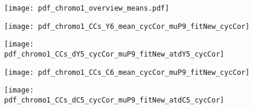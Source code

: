 
\begin{figure}
	\centering
	\texttt{[image: pdf\_chromo1\_overview\_means.pdf]}
	\clearpage %
	\label{fig:XXX:XXX}
\end{figure}	

\clearpage



\begin{figure}
	\centering
	\texttt{[image: pdf\_chromo1\_CCs\_Y6\_mean\_cycCor\_muP9\_fitNew\_cycCor]}
	\clearpage %
	\label{fig:XXX:XXX}
\end{figure}	

\clearpage



\begin{figure}
	\centering
	\texttt{[image: pdf\_chromo1\_CCs\_dY5\_cycCor\_muP9\_fitNew\_atdY5\_cycCor]}
	\clearpage %
	\label{fig:XXX:XXX}
\end{figure}	

\clearpage



\begin{figure}
	\centering
	\texttt{[image: pdf\_chromo1\_CCs\_C6\_mean\_cycCor\_muP9\_fitNew\_cycCor]}
	\clearpage %
	\label{fig:XXX:XXX}
\end{figure}	

\clearpage



\begin{figure}
	\centering
	\texttt{[image: pdf\_chromo1\_CCs\_dC5\_cycCor\_muP9\_fitNew\_atdC5\_cycCor]}
	\clearpage %
	\label{fig:XXX:XXX}
\end{figure}	

